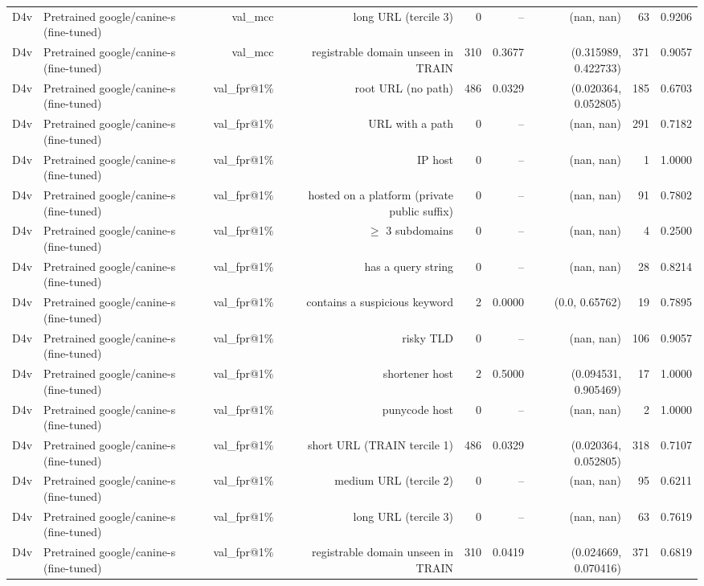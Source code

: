 \begin{table}[t]
\begin{tabular}{llrrrrrrr}
D4v & Pretrained google/canine-s (fine-tuned) & val\_mcc & long URL (tercile 3) & 0 & -- & (nan, nan) & 63 & 0.9206 \\
D4v & Pretrained google/canine-s (fine-tuned) & val\_mcc & registrable domain unseen in TRAIN & 310 & 0.3677 & (0.315989, 0.422733) & 371 & 0.9057 \\
D4v & Pretrained google/canine-s (fine-tuned) & val\_fpr@1\% & root URL (no path) & 486 & 0.0329 & (0.020364, 0.052805) & 185 & 0.6703 \\
D4v & Pretrained google/canine-s (fine-tuned) & val\_fpr@1\% & URL with a path & 0 & -- & (nan, nan) & 291 & 0.7182 \\
D4v & Pretrained google/canine-s (fine-tuned) & val\_fpr@1\% & IP host & 0 & -- & (nan, nan) & 1 & 1.0000 \\
D4v & Pretrained google/canine-s (fine-tuned) & val\_fpr@1\% & hosted on a platform (private public suffix) & 0 & -- & (nan, nan) & 91 & 0.7802 \\
D4v & Pretrained google/canine-s (fine-tuned) & val\_fpr@1\% & $\geq$ 3 subdomains & 0 & -- & (nan, nan) & 4 & 0.2500 \\
D4v & Pretrained google/canine-s (fine-tuned) & val\_fpr@1\% & has a query string & 0 & -- & (nan, nan) & 28 & 0.8214 \\
D4v & Pretrained google/canine-s (fine-tuned) & val\_fpr@1\% & contains a suspicious keyword & 2 & 0.0000 & (0.0, 0.65762) & 19 & 0.7895 \\
D4v & Pretrained google/canine-s (fine-tuned) & val\_fpr@1\% & risky TLD & 0 & -- & (nan, nan) & 106 & 0.9057 \\
D4v & Pretrained google/canine-s (fine-tuned) & val\_fpr@1\% & shortener host & 2 & 0.5000 & (0.094531, 0.905469) & 17 & 1.0000 \\
D4v & Pretrained google/canine-s (fine-tuned) & val\_fpr@1\% & punycode host & 0 & -- & (nan, nan) & 2 & 1.0000 \\
D4v & Pretrained google/canine-s (fine-tuned) & val\_fpr@1\% & short URL (TRAIN tercile 1) & 486 & 0.0329 & (0.020364, 0.052805) & 318 & 0.7107 \\
D4v & Pretrained google/canine-s (fine-tuned) & val\_fpr@1\% & medium URL (tercile 2) & 0 & -- & (nan, nan) & 95 & 0.6211 \\
D4v & Pretrained google/canine-s (fine-tuned) & val\_fpr@1\% & long URL (tercile 3) & 0 & -- & (nan, nan) & 63 & 0.7619 \\
D4v & Pretrained google/canine-s (fine-tuned) & val\_fpr@1\% & registrable domain unseen in TRAIN & 310 & 0.0419 & (0.024669, 0.070416) & 371 & 0.6819 \\

\end{tabular}
\end{table}
